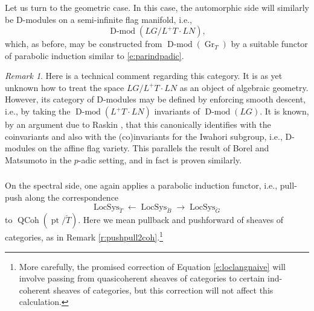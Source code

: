 \documentclass[10pt]{amsart}
\newcommand{\LS}{\on{LocSys}_{\cG}}
\newcommand{\on}{\operatorname}
\newcommand{\Dmod}{\on{D-mod}}
\theoremstyle{remark}
\newtheorem{re}[subsubsection]{Remark}
\newcommand{\Gr}{\operatorname{Gr}}
\numberwithin{equation}{section}
\newcommand{\cG}{\check{G}}
\newcommand{\QCoh}{\on{QCoh}}
\begin{document}
	
	\subsubsection{} 	Let us turn to the geometric case. In this case, the 
	automorphic side will 
	similarly be D-modules on a semi-infinite flag manifold, i.e., 
	\[
	  \Dmod( LG / L^+ T \cdot LN),
	\] 
	which, as before, may be constructed from $\Dmod(\Gr_T)$ by a suitable 
	functor of 	parabolic induction similar to \eqref{e:parindpadic}. 
	
	\begin{re} Here is a technical comment regarding this category. It is as 
	yet unknown how to treat the space $LG/L^+T \cdot LN$ as an object of 
	algebraic 
	geometry. However, its category of D-modules may be defined by enforcing 
	smooth descent, i.e., by taking the $\Dmod(L^+T \cdot LN)$ invariants  of 
	$\Dmod(LG)$. It is known, by an argument due to Raskin  \cite{raskin2ndadjoint}, that this canonically identifies 
	with the coinvariants and also with the (co)invariants for the 
	Iwahori subgroup, i.e., D-modules on the
	affine flag variety. This parallels the result of Borel and Matsumoto in the $p$-adic setting, and in fact is proven similarly.
	\end{re}
	 
	 
	 
	 \subsubsection{} On the spectral side, one again applies a parabolic 
	 induction functor, 
	 i.e., pull-push along the correspondence 
	 \[
	    \on{LocSys}_{\check{T}} \leftarrow \on{LocSys}_{\check{B}} \rightarrow 
	    \LS
	 \]
	  to $\QCoh(\on{pt}/\check{T})$. Here we mean pullback and pushforward of 
	  sheaves of categories, as in Remark \ref{r:pushpull2coh}.\footnote{More 
	  carefully, the promised correction of Equation \eqref{e:loclangnaive} 
	  will involve passing from 
	  quasicoherent sheaves of categories to certain ind-coherent sheaves of 
	  categories, but this correction will not affect this calculation.}
	  
	  
	  
\end{document}
